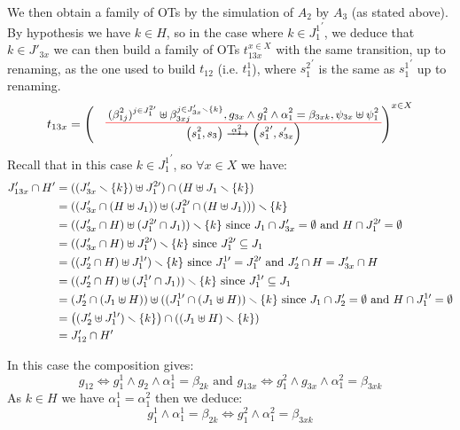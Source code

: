 \documentclass[runningheads]{llncs}
\begin{document}
\begin{enumerate}
We then obtain a family of OTs by the simulation of $A_2$ by $A_3$ (as stated above).
By hypothesis we have $k \in H$, so in the case where $k \in {J^1_{1}}^{\prime}$, we deduce that $k \in J'_{3x}$ we can  then build  a family of OTs $t_{13x}^{x\in X}$ with the same transition, up to renaming, as the one used to build $t_{12}$ (i.e. $t_1^1$), where ${s^2_{1}}^\prime$ is the same as ${s^1_{1}}^\prime$ up to renaming.
\[
t_{13x} = \left(\OT{\mpar{s^2_1, s_3}}{\mpar{{s^2_{1}}',s'_{3x}}}{\alpha^2_{1}}  {{(\beta^2_{1j})^{j \in J^{2 \prime}_1}}\uplus \beta_{3xj}^{j \in J'_{3x}  \setminus \{k\}} }{g_{3x} \wedge g^2_1 \wedge \alpha^2_1 = \beta_{3xk}}{\psi_{3x} \uplus \psi^2_1}
\right)^{x\in X}\]
Recall that in this case  $k \in {J^1_{1}}^{\prime}$, so $\forall x \in X$ we have:
\begin{align*}
  J'_{13x} \cap H'  
&=((J'_{3x}  \smallsetminus {\left\{k\right\}})\uplus J^{2 \prime}_{1} ) \cap (H\uplus J_1 \smallsetminus\{k\} )\\
&=((J'_{3x}\cap (H\uplus J_1))\uplus (J^{2 \prime}_{1}\cap (H\uplus J_1)))\smallsetminus {\left\{k\right\}}\\
&=((J'_{3x}\cap H)\uplus (J^{2 \prime}_{1}\cap  J_1))\smallsetminus {\left\{k\right\}}\text{ since } J_1\cap J'_{3x} = \emptyset \text{ and } H\cap J^{2 \prime}_{1} = \emptyset\\
& =((J'_{3x}\cap H)\uplus J^{2 \prime}_{1})\smallsetminus {\left\{k\right\}}\text{ since } J^{2 \prime}_{1}\subseteq J_1\\
& =((J'_2\cap H)\uplus J^{1 \prime}_{1})\smallsetminus {\left\{k\right\}} \text{ since } J^{1 \prime}_{1}=J^{2 \prime}_{1} \text{ and } J'_2 \cap H = J'_{3x} \cap H\\
&= ((J'_2 \cap H) \uplus (J^{1 \prime}_{1} \cap J_1)) \smallsetminus {\left\{k\right\}}\text{ since } J^{1 \prime}_{1}\subseteq J_1\\ 
& = (J'_2\cap (J_1 \uplus H)) \uplus ((J^{1 \prime}_{1} \cap (J_1 \uplus H)) \smallsetminus {\left\{k\right\}} \text{ since } J_1\cap J'_{2} = \emptyset \text{ and } H\cap J^{1 \prime}_{1} = \emptyset\\
		& = {\left((J'_2  \uplus J^{1 \prime}_{1})\smallsetminus {\left\{k\right\}}\right)} \cap {\left((J_{1} \uplus H) \smallsetminus{\left\{k\right\}}\right)}\\
		& = J'_{12} \cap H'
\end{align*}	

In this case the composition gives: \[g_{12} \Leftrightarrow g^1_1 \wedge g_2 \wedge \alpha^1_1=\beta_{2k} \text{ and }
g_{13x}  \Leftrightarrow g^2_1 \wedge g_{3x} \wedge  \alpha^2_1=\beta_{3xk}\]
As $k \in H$ we have   
$\alpha^1_1= \alpha^2_1$ then we  deduce:
\[g^1_1 \wedge \alpha^1_1=\beta_{2k}  \Leftrightarrow g^2_1 \wedge \alpha^2_1= \beta_{3xk}\]




\end{enumerate}
\end{document}
